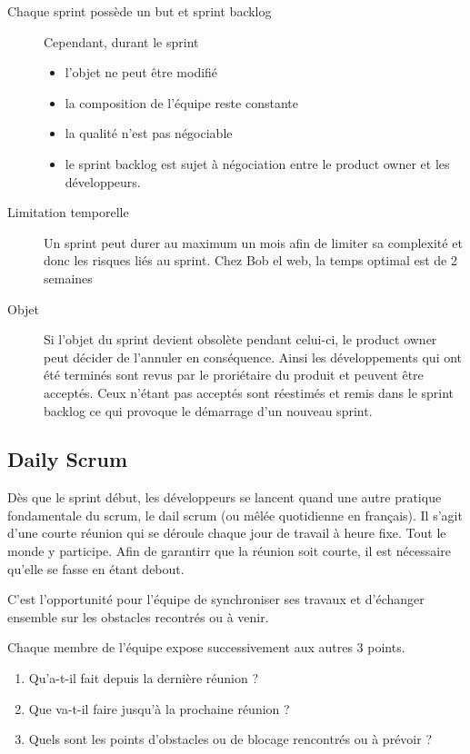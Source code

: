 \begin{description}
    \item[Chaque sprint possède un but et sprint backlog]
    {
        Cependant, durant le sprint 
        
        \begin{itemize}
        \item l'objet ne peut être modifié
        \item la composition de l'équipe reste constante
        \item la qualité n'est pas négociable
        \item le sprint backlog est sujet à négociation entre le product owner et les développeurs. 
        \end{itemize}
    }
    \item[Limitation temporelle]
    {Un sprint peut durer au maximum un mois afin de limiter sa complexité et donc les risques liés au sprint. Chez Bob el web, la temps optimal est de 2 semaines
    }
    \item[Objet]
    {
        Si l'objet du sprint devient obsolète pendant celui-ci, le product owner peut décider de l'annuler en conséquence.  
        Ainsi les développements qui ont été terminés sont revus par le proriétaire du produit et peuvent être acceptés. 
        Ceux n'étant pas acceptés sont réestimés et remis dans le sprint backlog ce qui provoque le démarrage d'un nouveau sprint. 
    }
\end{description}



\subsection{Daily Scrum}

Dès que le sprint début, les développeurs se lancent quand une autre pratique fondamentale du scrum, le dail scrum (ou mêlée quotidienne en français). 
Il s'agit d'une courte réunion qui se déroule chaque jour de travail à heure fixe. Tout le monde y participe. 
Afin de garantirr que la réunion soit courte, il est nécessaire qu'elle se fasse en étant debout. 

C'est l'opportunité pour l'équipe de synchroniser ses travaux et d'échanger ensemble sur les obstacles recontrés ou à venir. 

Chaque membre de l'équipe expose successivement aux autres 3 points.

\begin{enumerate}
\item Qu'a-t-il fait depuis la dernière réunion ? 
\item Que va-t-il faire jusqu'à la prochaine réunion ? 
\item Quels sont les points d'obstacles ou de blocage rencontrés ou à prévoir ? 
\end{enumerate}


